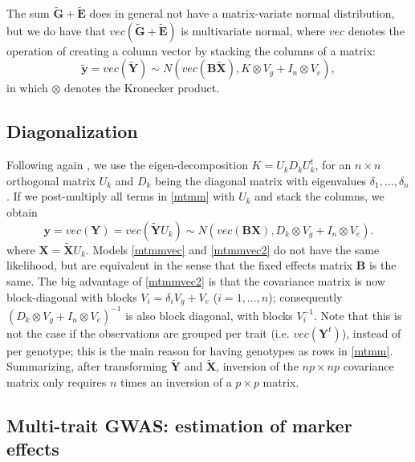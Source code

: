 \documentclass[12pt]{article}
\begin{document}
The sum $\mathbf{\tilde G} + \mathbf{\tilde E}$ does in general not have a matrix-variate normal distribution, but we do have that $vec(\mathbf{\tilde G} + \mathbf{\tilde E})$ is multivariate normal, where $vec$ denotes the operation of creating a column vector by stacking the columns of a matrix:
%
\begin{equation} \label{mtmmvec}
\mathbf{\tilde y} = vec(\mathbf{\tilde Y}) \sim N\left(vec(\mathbf{B}  \mathbf{\tilde X}),  K \otimes V_g  + I_n \otimes V_e\right),
\end{equation}
in which $\otimes$ denotes the Kronecker product.

\subsection{Diagonalization}

Following again \cite{zhou_stephens_2014}, we use the eigen-decomposition  $K = U_k D_k U_k^t$, for an $n \times n$ orthogonal matrix $U_k$ and $D_k$ being the diagonal matrix with eigenvalues $\delta_1,\ldots,\delta_n$. If we post-multiply all terms in \eqref{mtmm} with $U_k$ and stack the columns, we obtain  
%
\begin{equation} \label{mtmmvec2}
\mathbf{y} = vec(\mathbf{Y}) = vec(\mathbf{\tilde Y} U_k) \sim N\left(vec(\mathbf{B} \mathbf{X}),  D_k \otimes V_g  + I_n \otimes V_e\right).
\end{equation}
%
where $\mathbf{X} = \mathbf{\tilde X} U_k$. Models \eqref{mtmmvec} and \eqref{mtmmvec2} do not have the same likelihood, but are equivalent in the sense that the fixed effects matrix $\mathbf{B}$ is the same. The big advantage of \eqref{mtmmvec2} is that the covariance matrix is now block-diagonal with blocks $V_i = \delta_i V_g + V_e$ ($i = 1,\ldots,n$); consequently $(D_k \otimes V_g  + I_n \otimes V_e)^{-1}$ is also block diagonal, with blocks $V_i^{-1}$. Note that this is not the case if the observations are grouped per trait (i.e. $vec(\mathbf{Y}^t)$), instead of per genotype; this is the main reason for having genotypes as rows in \eqref{mtmm}. Summarizing, after transforming $\mathbf{\tilde Y}$ and $\mathbf{\tilde X}$, inversion of the  $np \times np$ covariance matrix  only requires $n$ times an inversion of a $p \times p$ matrix.

\subsection{Multi-trait GWAS: estimation of marker effects} \label{gwas}
\end{document}
